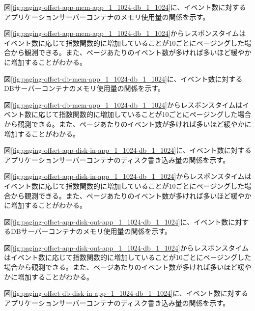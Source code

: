 \documentclass[../../../../main]{subfiles}
\begin{document}
    \label{subsubsubsec:result-paging-offset-only-limit-mem}

    図\ref{fig:paging-offset-app-mem-app_1_1024-db_1_1024}に、イベント数に対するアプリケーションサーバーコンテナのメモリ使用量の関係を示す。

    

    図\ref{fig:paging-offset-app-mem-app_1_1024-db_1_1024}からレスポンスタイムはイベント数に応じて指数関数的に増加していることが10ごとにページングした場合から観測できる。また、ページあたりのイベント数が多ければ多いほど緩やかに増加することがわかる。

    図\ref{fig:paging-offset-db-mem-app_1_1024-db_1_1024}に、イベント数に対するDBサーバーコンテナのメモリ使用量の関係を示す。

    

    図\ref{fig:paging-offset-db-mem-app_1_1024-db_1_1024}からレスポンスタイムはイベント数に応じて指数関数的に増加していることが10ごとにページングした場合から観測できる。また、ページあたりのイベント数が多ければ多いほど緩やかに増加することがわかる。

    \label{subsubsubsec:result-paging-offset-only-limit-disk-io}

    図\ref{fig:paging-offset-app-disk-in-app_1_1024-db_1_1024}に、イベント数に対するアプリケーションサーバーコンテナのディスク書き込み量の関係を示す。

    

    図\ref{fig:paging-offset-app-disk-in-app_1_1024-db_1_1024}からレスポンスタイムはイベント数に応じて指数関数的に増加していることが10ごとにページングした場合から観測できる。また、ページあたりのイベント数が多ければ多いほど緩やかに増加することがわかる。

    図\ref{fig:paging-offset-app-disk-out-app_1_1024-db_1_1024}に、イベント数に対するDBサーバーコンテナのメモリ使用量の関係を示す。

    

    図\ref{fig:paging-offset-app-disk-out-app_1_1024-db_1_1024}からレスポンスタイムはイベント数に応じて指数関数的に増加していることが10ごとにページングした場合から観測できる。また、ページあたりのイベント数が多ければ多いほど緩やかに増加することがわかる。

    図\ref{fig:paging-offset-db-disk-in-app_1_1024-db_1_1024}に、イベント数に対するアプリケーションサーバーコンテナのディスク書き込み量の関係を示す。
\end{document}
